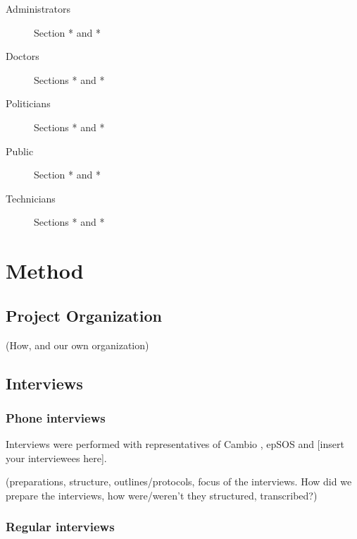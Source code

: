 \documentclass[14pt]{article}
\begin{document}
\begin{description}
\item[Administrators] Section * and *
\item[Doctors] Sections * and *
\item[Politicians] Sections * and *
\item[Public] Section * and *
\item[Technicians] Sections * and *
\end{description}

\newpage

\section{Method}

\subsection{Project Organization}
 (How, and our own organization)

\subsection{Interviews}
\subsubsection{Phone interviews}

Interviews were performed with representatives of Cambio \cite{Cambio}, epSOS \cite{epSOS} and [insert your interviewees here].

(preparations, structure, outlines/protocols, focus of the interviews.
How did we prepare the interviews, how were/weren't they structured, transcribed?)

\subsubsection{Regular interviews}
\end{document}
